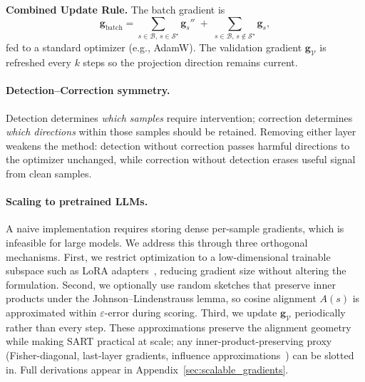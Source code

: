 \textbf{Combined Update Rule.} The batch gradient is
\[
\mathbf{g}_{\mathrm{batch}} =
\sum_{s \in \mathcal{B},\, s \in \mathcal{S}^\star} \mathbf{g}_s'' \;+\;
\sum_{s \in \mathcal{B},\, s \notin \mathcal{S}^\star} \mathbf{g}_s,
\]
fed to a standard optimizer (e.g., AdamW). The validation gradient $\mathbf{g}_{\mathcal{V}}$ is refreshed every $k$ steps so the projection direction remains current.

\paragraph{Detection--Correction symmetry.} Detection determines \emph{which samples} require intervention; correction determines \emph{which directions} within those samples should be retained. Removing either layer weakens the method: detection without correction passes harmful directions to the optimizer unchanged, while correction without detection erases useful signal from clean samples.

\paragraph{Scaling to pretrained LLMs.} A naive implementation requires storing dense per-sample gradients, which is infeasible for large models. We address this through three orthogonal mechanisms. First, we restrict optimization to a low-dimensional trainable subspace such as LoRA adapters~\cite{hu2022lora}, reducing gradient size without altering the formulation. Second, we optionally use random sketches that preserve inner products under the Johnson--Lindenstrauss lemma, so cosine alignment $A(s)$ is approximated within $\varepsilon$-error during scoring. Third, we update $\mathbf{g}_{\mathcal{V}}$ periodically rather than every step. These approximations preserve the alignment geometry while making SART practical at scale; any inner-product-preserving proxy (Fisher-diagonal, last-layer gradients, influence approximations~\cite{koh2020understandingblackboxpredictionsinfluence}) can be slotted in. Full derivations appear in Appendix~\ref{sec:scalable_gradients}.
